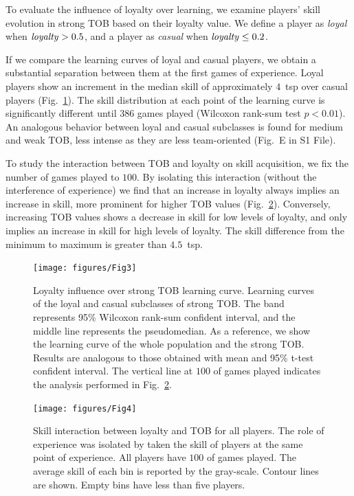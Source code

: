 \documentclass[a4paper,10pt]{book}
\theoremstyle{definition}
\begin{document}
To evaluate the influence of loyalty over learning, we examine players' skill evolution in strong TOB based on their loyalty value.
We define a player as \emph{loyal} when $\text{\emph{loyalty}}>0.5$, and a player as \emph{casual} when $\text{\emph{loyalty}}\leq 0.2$.

If we compare the learning curves of loyal and casual players, we obtain a substantial separation between them at the first games of experience. 
Loyal players show an increment in the median skill of approximately $4$~tsp over casual players (Fig.~\ref{learningskill_pteam89_ployal}).
The skill distribution at each point of the learning curve is significantly different until $386$ games played (Wilcoxon rank-sum test $p<0.01$).
An analogous behavior between loyal and casual subclasses is found for medium and weak TOB, less intense as they are less team-oriented (Fig.~E in S1 File).

To study the interaction between TOB and loyalty on skill acquisition, we fix the number of games played to $100$.
By isolating this interaction (without the interference of experience) we find that an increase in loyalty always implies an increase in skill, more prominent for higher TOB values (Fig.~\ref{skillModels_loyaltyTeamOriented_imageEmpirical}).
Conversely, increasing TOB values shows a decrease in skill for low levels of loyalty, and only implies an increase in skill for high levels of loyalty. 
The skill difference from the minimum to maximum is greater than $4.5$~tsp.

\begin{figure}[ht!]
\centering
\texttt{[image: figures/Fig3]}
\caption{Loyalty influence over strong TOB learning curve. Learning curves of the loyal and casual subclasses of strong TOB. The band represents 95\% Wilcoxon rank-sum confident interval, and the middle line represents the pseudomedian. As a reference, we show the learning curve of the whole population and the strong TOB. Results are analogous to those obtained with mean and 95\% t-test confident interval. The vertical line at $100$ of games played indicates the analysis performed in Fig.~\protect\ref{skillModels_loyaltyTeamOriented_imageEmpirical}.
}
\label{learningskill_pteam89_ployal}
\end{figure}

\begin{figure}[ht!]
\centering
\texttt{[image: figures/Fig4]}
\caption{Skill interaction between loyalty and TOB for all players. The role of experience was isolated by taken the skill of players at the same point of experience. All players have $100$ of games played. The average skill of each bin is reported by the gray-scale. Contour lines are shown. Empty bins have less than five players.}
\label{skillModels_loyaltyTeamOriented_imageEmpirical}
\end{figure}
\end{document}
